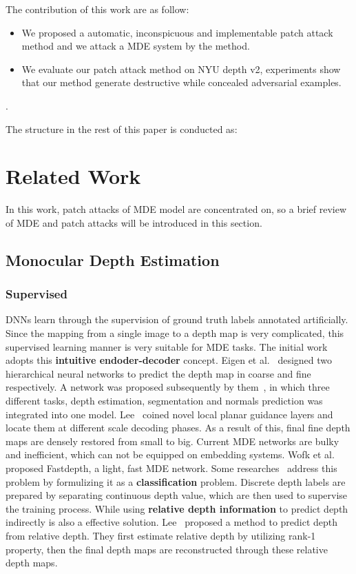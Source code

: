 \documentclass[10pt,twocolumn,letterpaper]{article}
\begin{document}
The contribution of this work are as follow:
\begin{itemize}
	\item We proposed a automatic, inconspicuous and
	implementable patch attack method and we 
	attack a MDE system by the method. 
	 
	\item We evaluate our patch attack method on
	NYU depth v2, experiments
	show that our method generate destructive while 
    concealed adversarial examples.
\end{itemize}.

The structure in the rest of this paper is conducted as:

\section{Related Work}
In this work, patch attacks of MDE model are concentrated on, 
so a brief review of MDE and patch attacks will be 
introduced in this section.

\subsection{Monocular Depth Estimation}
\subsubsection{Supervised}
DNNs learn through the supervision of ground truth labels 
annotated artificially. Since the mapping from a single image 
to a depth map is very complicated, this supervised learning 
manner is very suitable for MDE tasks. The initial work adopts 
this \textbf{intuitive endoder-decoder} concept. 
Eigen et al.~\cite{Eigen_2014_nips} designed two hierarchical 
neural networks to predict 
the depth map in coarse and fine respectively.
A network was proposed subsequently by them~\cite{Eigen_2015_ICCV}, 
in which three 
different tasks, depth estimation, segmentation and 
normals prediction was integrated into one model.
Lee~\cite{lee_2019_arxiv} coined novel local planar guidance layers and locate 
them at different scale decoding phases. 
As a result of this, final fine depth maps are densely 
restored from small to big.
Current MDE networks are bulky and inefficient, which can not
be equipped on embedding systems. Wofk et al.~\cite{Wofk_2019_ICRA} 
proposed Fastdepth,
a light, fast MDE network.
Some researches~\cite{Li_2018_ACCV,cao_2017_CSVT,Fu_2018_CVPR} 
address this problem by formulizing it as 
a \textbf{classification} problem. 
Discrete depth labels are prepared by separating 
continuous depth value, which are then used to supervise 
the training process.
While using \textbf{relative depth information} to predict depth 
indirectly is also a effective solution.
Lee~\cite{Lee_2019_CVPR} proposed a method to predict depth from relative depth. 
They first estimate relative depth by utilizing rank-1 property, 
then the final depth maps are reconstructed through these relative 
depth maps.
\end{document}

